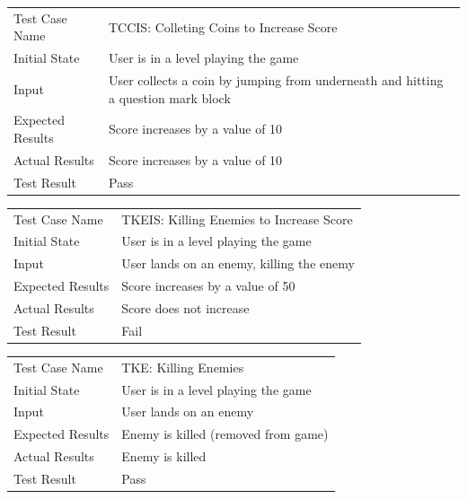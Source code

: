 \documentclass[12pt, titlepage]{article}
\begin{document}
\begin{center}
\begin{tabular}{ | l | p{10cm} | }
\hline
Test Case Name & TCCIS: Colleting Coins to Increase Score	\\
Initial State & User is in a level playing the game	\\
Input & User collects a coin by jumping from underneath and hitting a question mark block	\\
Expected Results & Score increases by a value of 10	\\
Actual Results & Score increases by a value of 10	\\
Test Result & Pass	\\
\hline
\end{tabular}
\end{center}

\begin{center}
\begin{tabular}{ | l | p{10cm} | }
\hline
Test Case Name & TKEIS: Killing Enemies to Increase Score	\\
Initial State & User is in a level playing the game	\\
Input & User lands on an enemy, killing the enemy \hspace*{4 in} \\
Expected Results & Score increases by a value of 50	\\
Actual Results & Score does not increase	\\
Test Result & Fail	\\
\hline
\end{tabular}
\end{center}

\begin{center}
\begin{tabular}{ | l | p{10cm} | }
\hline
Test Case Name & TKE: Killing Enemies	\\
Initial State & User is in a level playing the game	\\
Input & User lands on an enemy 	\\
Expected Results & Enemy is killed (removed from game)	 \hspace*{4 in}\\
Actual Results & Enemy is killed	\\
Test Result & Pass	\\
\hline
\end{tabular}
\end{center}
\end{document}
